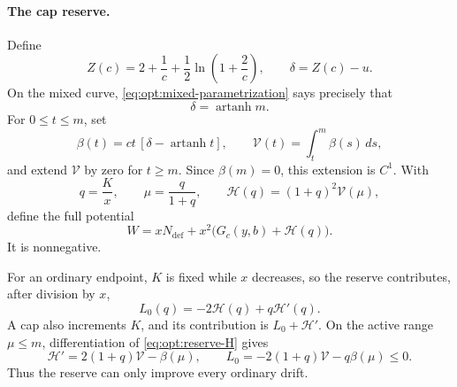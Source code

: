 \paragraph{The cap reserve.}
Define
\begin{equation}
 Z(c)=2+\frac1c+\frac12\ln\!\left(1+\frac2c\right),
 \qquad
 \delta=Z(c)-u.
 \label{eq:opt:Z-delta}
\end{equation}
On the mixed curve, \eqref{eq:opt:mixed-parametrization} says precisely
that
\begin{equation}
 \delta=\operatorname{artanh}m.
 \label{eq:opt:delta-atanh}
\end{equation}
For $0\le t\le m$, set
\begin{equation}
 \beta(t)=ct\,[\delta-\operatorname{artanh}t],
 \qquad
 \mathcal V(t)=\int_t^m\beta(s)\,ds,
 \label{eq:opt:reserve-integral}
\end{equation}
and extend $\mathcal V$ by zero for $t\ge m$.  Since
$\beta(m)=0$, this extension is $C^1$.  With
\begin{equation}
 q=\frac Kx,
 \qquad
 \mu=\frac{q}{1+q},
 \qquad
 \mathcal H(q)=(1+q)^2\mathcal V(\mu),
 \label{eq:opt:reserve-H}
\end{equation}
define the full potential
\begin{equation}
 W=xN_{\mathrm{def}}+x^2\bigl(G_c(y,b)+\mathcal H(q)\bigr).
 \label{eq:opt:full-potential}
\end{equation}
It is nonnegative.

For an ordinary endpoint, $K$ is fixed while $x$ decreases, so the
reserve contributes, after division by $x$,
\begin{equation}
 L_0(q)=-2\mathcal H(q)+q\mathcal H'(q).
 \label{eq:opt:L0}
\end{equation}
A cap also increments $K$, and its contribution is
$L_0+\mathcal H'$.  On the active range $\mu\le m$, differentiation of
\eqref{eq:opt:reserve-H} gives
\begin{equation}
 \mathcal H'=2(1+q)\mathcal V-\beta(\mu),
 \qquad
 L_0=-2(1+q)\mathcal V-q\beta(\mu)\le0.
 \label{eq:opt:reserve-derivatives}
\end{equation}
Thus the reserve can only improve every ordinary drift.


